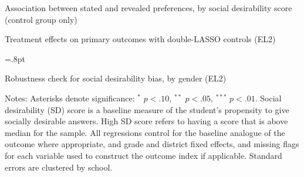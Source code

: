 \documentclass[letterpaper,12pt,pdftex]{article}
\begin{document}
\addtocounter{table}{-1}

\clearpage
\newpage

\begin{table}
\footnotesize
\caption{Association between stated and revealed preferences, by social desirability score (control group only)}\label{sch_dowry_sds}
\begin{center}
	
\end{center}
\end{table}

\clearpage
\newpage

\begin{landscape}
\begin{table}
\caption{Treatment effects on primary outcomes with double-LASSO controls (EL2)}
\label{tab_extended2_el2}
\begin{center}
\tabcolsep=.8pt
\footnotesize

\end{center}
\end{table}
\end{landscape}
\restoregeometry

\clearpage
\newpage

\begin{table}
\tabcolsep=2.8pt
		\caption{Robustness check for social desirability bias, by gender (EL2)}
		\label{el2_sds_panels}
		\vspace{.4cm}
		\begin{center}
			\footnotesize
			
		\end{center}
\flushleft \footnotesize {Notes: Asterisks denote significance: $^*$ $p < .10$, $^{**}$ $p < .05$, $^{***}$ $p < .01$. Social desirability (SD) score is a baseline measure of the student's propensity to give socially desirable answers. High SD score refers to having a score that is above median for the sample. All regressions control for the baseline analogue of the outcome where appropriate, and grade and district fixed effects, and missing flags for each variable used to construct the outcome index if applicable. Standard errors are clustered by school.}
\end{table}
\restoregeometry
\end{document}
